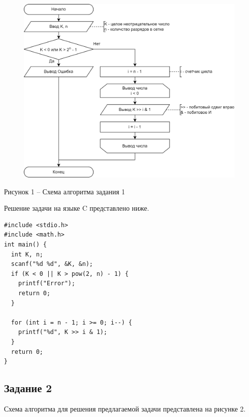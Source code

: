 \documentclass[a4paper,14pt]{extarticle}
\begin{document}
  \begin{figure}[h]
    \centering
    \includegraphics[width=0.8\linewidth]{schemes/s-1}
  \end{figure}
  \begin{center}
    Рисунок 1 – Схема алгоритма задания 1
  \end{center}

  Решение задачи на языке C представлено ниже.

  \begin{lstlisting}[tabsize=2,basicstyle=\ttfamily]
#include <stdio.h>
#include <math.h>
int main() {
  int K, n;
  scanf("%d %d", &K, &n);
  if (K < 0 || K > pow(2, n) - 1) {
    printf("Error");
    return 0;
  }
  
  for (int i = n - 1; i >= 0; i--) {
    printf("%d", K >> i & 1);
  }
  return 0;
}
  \end{lstlisting}

  \subsection*{Задание 2}
  Схема алгоритма для решения предлагаемой задачи представлена на рисунке 2.
\end{document}
